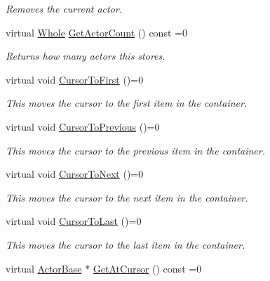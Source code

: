 \begin{DoxyCompactItemize}
\begin{DoxyCompactList}\small\item\em Removes the current actor. \item\end{DoxyCompactList}\item 
virtual \hyperlink{namespacephys_a460f6bc24c8dd347b05e0366ae34f34a}{Whole} \hyperlink{classphys_1_1ActorContainerBase_aa5ec651d4634b2d90efe2a76f9d2fbdd}{GetActorCount} () const =0
\begin{DoxyCompactList}\small\item\em Returns how many actors this stores. \item\end{DoxyCompactList}\item 
virtual void \hyperlink{classphys_1_1ActorContainerBase_ab1a44758d7c17e70ff2e0f8de47424c3}{CursorToFirst} ()=0
\begin{DoxyCompactList}\small\item\em This moves the cursor to the first item in the container. \item\end{DoxyCompactList}\item 
virtual void \hyperlink{classphys_1_1ActorContainerBase_a7c424168c0bbd973b283a083714123b3}{CursorToPrevious} ()=0
\begin{DoxyCompactList}\small\item\em This moves the cursor to the previous item in the container. \item\end{DoxyCompactList}\item 
virtual void \hyperlink{classphys_1_1ActorContainerBase_a1aa337456a4e74cb5740dbae08778072}{CursorToNext} ()=0
\begin{DoxyCompactList}\small\item\em This moves the cursor to the next item in the container. \item\end{DoxyCompactList}\item 
virtual void \hyperlink{classphys_1_1ActorContainerBase_afad072e018a04c190e5e5fb93b82b354}{CursorToLast} ()=0
\begin{DoxyCompactList}\small\item\em This moves the cursor to the last item in the container. \item\end{DoxyCompactList}\item 
virtual \hyperlink{classphys_1_1ActorBase}{ActorBase} $\ast$ \hyperlink{classphys_1_1ActorContainerBase_a2c8fb86a9e188aece105b2a753ccc19a}{GetAtCursor} () const =0

\end{DoxyCompactItemize}

